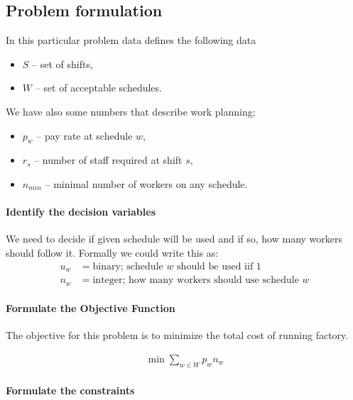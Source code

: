 \subsection{Problem formulation}

In this particular problem data defines the following data 

\begin{itemize}
  \item $S$ -- set of shifts,  
  \item $W$ -- set of acceptable schedules.
\end{itemize}

We have also some numbers that describe work planning;
\begin{itemize}
  \item $p_w$ -- pay rate at schedule $w$,
  \item $r_s$ -- number of staff required at shift $s$,
  \item $n_{min}$ -- minimal number of workers on any schedule.
\end{itemize}

\paragraph{Identify the decision variables}

We need to decide if given schedule will be used and if so, how many workers should follow it. Formally we could write this as:
\begin{align} 
  u_w &= \text{binary; schedule $w$ should be used iif 1} \\
  n_w &= \text{integer; how many workers should use schedule $w$}
\end{align} 

\paragraph{Formulate the Objective Function}

The objective for this problem is to minimize the total cost of running factory.

\begin{align}
   \min \mathop\sum\limits_{w \in W} p_w n_w
\end{align}

\paragraph{Formulate the constraints}


